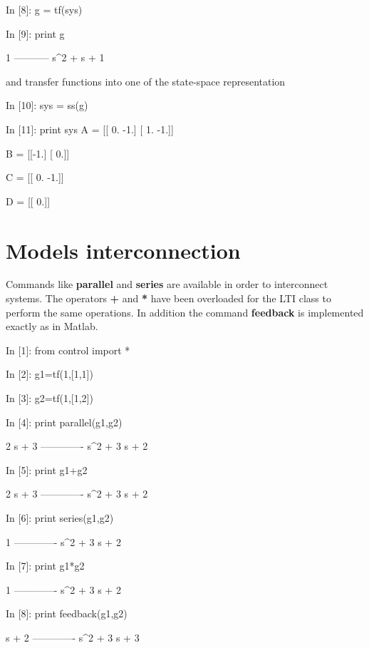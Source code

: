 \begin{code}
In [8]: g = tf(sys)

In [9]: print g

     1
-----------
s^2 + s + 1

\end{code}

and transfer functions into one of the  state-space representation

\begin{code}
In [10]: sys = ss(g)

In [11]: print sys
A = [[ 0. -1.]
 [ 1. -1.]]

B = [[-1.]
 [ 0.]]

C = [[ 0. -1.]]

D = [[ 0.]]

\end{code}
\section{Models interconnection}

Commands like \textbf{parallel} and \textbf{series} are available in order to 
interconnect systems. The operators \textbf{+} and \textbf{*} have been 
overloaded for the LTI class to perform the same operations. In addition the 
command \textbf{feedback} is implemented exactly as in Matlab.

\begin{code}
In [1]: from control import *

In [2]: g1=tf(1,[1,1])

In [3]: g2=tf(1,[1,2])

In [4]: print parallel(g1,g2)

   2 s + 3
-------------
s^2 + 3 s + 2


In [5]: print g1+g2

   2 s + 3
-------------
s^2 + 3 s + 2
\end{code}

\begin{code}
In [6]: print series(g1,g2)

      1
-------------
s^2 + 3 s + 2


In [7]: print g1*g2

      1
-------------
s^2 + 3 s + 2
\end{code}

\begin{code}
In [8]: print feedback(g1,g2)

    s + 2
-------------
s^2 + 3 s + 3
\end{code}

